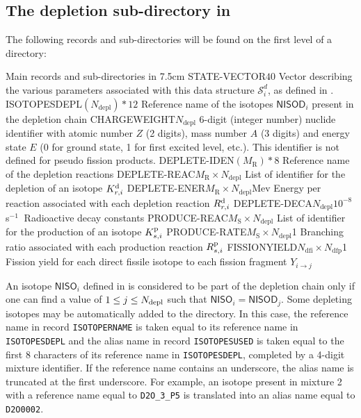 \subsection{The depletion sub-directory  in
}\label{sect:microlibdirdepletion}

The following records and sub-directories will be found on the first level of a
 directory:

\begin{DescriptionEnregistrement}{Main records and sub-directories in
}{7.5cm}
\label{tabl:tabchain}
\IntEnr
  {STATE-VECTOR}{$40$}
  {Vector describing the various parameters associated with this data structure $\mathcal{S}^{d}_{i}$,
  as defined in .}
\CharEnr
  {ISOTOPESDEPL}{$(N_{\mathrm{depl}})*12$}
  {Reference name of the isotopes $\mathsf{NISOD}_{i}$ present in the depletion chain}
\IntEnr
  {CHARGEWEIGHT}{$N_{\mathrm{depl}}$}
  {6-digit (integer number) nuclide identifier with atomic number $Z$ (2
  digits), mass number $A$ (3 digits) and energy state $E$ (0 for ground state, 1
  for first excited level, etc.). This identifier is not defined for pseudo
  fission products.}
\CharEnr
  {DEPLETE-IDEN}{$(M_{\mathrm{R}})*8$}
  {Reference name of the depletion reactions}
\IntEnr
  {DEPLETE-REAC}{$M_{\mathrm{R}}\times N_{\mathrm{depl}}$}
  {List of identifier for the depletion of an isotope $K_{r,i}^{\rm d}$}
\RealEnr
  {DEPLETE-ENER}{$M_{\mathrm{R}}\times N_{\mathrm{depl}}$}{Mev}
  {Energy per reaction associated with each depletion reaction $R_{r,i}^{\rm d}$}
\RealEnr
  {DEPLETE-DECA}{$N_{\mathrm{depl}}$}{$10^{-8}$ s$^{-1}\ $}
  {Radioactive decay constants}
\IntEnr
  {PRODUCE-REAC}{$M_{\mathrm{S}}\times N_{\mathrm{depl}}$}
  {List of identifier for the production of an isotope $K_{s,i}^{\rm p}$}
\RealEnr
  {PRODUCE-RATE}{$M_{\mathrm{S}}\times N_{\mathrm{depl}}$}{1}
  {Branching ratio associated with each production reaction $R_{s,i}^{\rm p}$}
\RealEnr
  {FISSIONYIELD}{$N_{\mathrm{dfi}}\times N_{\mathrm{dfp}}$}{1}
  {Fission yield for each direct fissile isotope to each fission fragment $Y_{i\to j}$}
\end{DescriptionEnregistrement}

An isotope $\mathsf{NISO}_{i}$ defined in  is considered
to be part of the depletion chain only if one can find a value of $1 \le j \le N_{\rm depl}$
such that $\mathsf{NISO}_{i}= \mathsf{NISOD}_{j}$.
Some depleting isotopes may be automatically added to the  directory.
In this case, the reference name in record {\tt ISOTOPERNAME} is taken equal
to its reference name in {\tt ISOTOPESDEPL} and the alias name in record
{\tt ISOTOPESUSED} is taken equal to the
first 8 characters of its reference name in {\tt ISOTOPESDEPL}, completed by a
4-digit mixture identifier. If the reference name contains an underscore, the
alias name is truncated at the first underscore. For example, an isotope
present in mixture 2 with a reference name equal to {\tt D2O\_3\_P5} is
translated into an alias name equal to {\tt D2O0002}.

